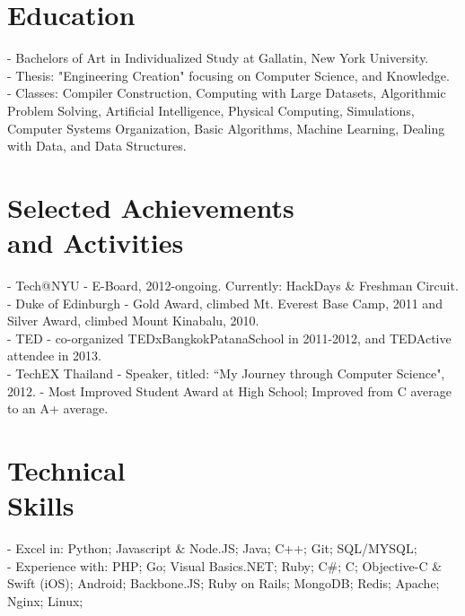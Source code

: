 \documentclass[margin]{res}
\begin{document}
\begin{resume}
\section{Education} 
- Bachelors of Art in Individualized Study at Gallatin, New York University. \\
- Thesis: "Engineering Creation" focusing on Computer Science, and Knowledge. \\
- Classes: Compiler Construction, Computing with Large Datasets, Algorithmic Problem Solving, Artificial Intelligence, Physical Computing, Simulations, Computer Systems Organization, Basic Algorithms, Machine Learning, Dealing with Data, and Data Structures.

\section{Selected Achievements \\ and Activities} 
- Tech@NYU - E-Board, 2012-ongoing. Currently: HackDays \& Freshman Circuit. \\
- Duke of Edinburgh - Gold Award, climbed Mt. Everest Base Camp, 2011 and Silver Award, climbed Mount Kinabalu, 2010. \\
- TED - co-organized TEDxBangkokPatanaSchool in 2011-2012, and TEDActive attendee in 2013. \\
- TechEX Thailand - Speaker, titled: ``My Journey through Computer Science", 2012.
- Most Improved Student Award at High School; Improved from C average to an A+ average.

\section{Technical \\ Skills}
- Excel in: Python; Javascript \& Node.JS; Java;  C++; Git; SQL/MYSQL; \\
- Experience with: PHP; Go; Visual Basics.NET; Ruby; C\#; C; Objective-C \& Swift (iOS); Android; Backbone.JS; Ruby on Rails; MongoDB; Redis; Apache; Nginx; Linux;

\end{resume} 
\end{document}
